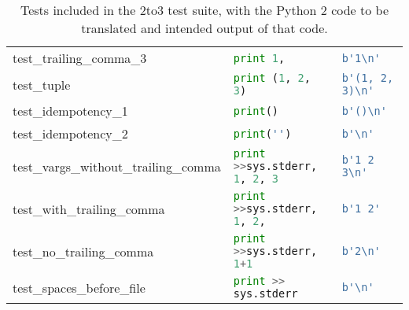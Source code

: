 \begin{table*}[ht]
\begin{tabular}{@{}l|ll@{}}
    test\_trailing\_comma\_3              & \lstinline[language=Python, style=pythonstyle]|print 1,                                             | & \lstinline[language=Python, style=pythonstyle]|b'1\n'                 | \\
    test\_tuple                           & \lstinline[language=Python, style=pythonstyle]|print (1, 2, 3)                                      | & \lstinline[language=Python, style=pythonstyle]|b'(1, 2, 3)\n'         | \\
    test\_idempotency\_1                  & \lstinline[language=Python, style=pythonstyle]|print()                                              | & \lstinline[language=Python, style=pythonstyle]|b'()\n'                | \\
    test\_idempotency\_2                  & \lstinline[language=Python, style=pythonstyle]|print('')                                            | & \lstinline[language=Python, style=pythonstyle]|b'\n'                  | \\
    test\_vargs\_without\_trailing\_comma & \lstinline[language=Python, style=pythonstyle]|print >>sys.stderr, 1, 2, 3| & \lstinline[language=Python, style=pythonstyle]|b'1 2 3\n'             | \\
    test\_with\_trailing\_comma           & \lstinline[language=Python, style=pythonstyle]|print >>sys.stderr, 1, 2,  | & \lstinline[language=Python, style=pythonstyle]|b'1 2'                                | \\
    test\_no\_trailing\_comma             & \lstinline[language=Python, style=pythonstyle]|print >>sys.stderr, 1+1    | & \lstinline[language=Python, style=pythonstyle]|b'2\n'                 | \\
    test\_spaces\_before\_file            & \lstinline[language=Python, style=pythonstyle]|print >> sys.stderr          | & \lstinline[language=Python, style=pythonstyle]|b'\n'                  | \\ \bottomrule
    \end{tabular}
    \caption{Tests included in the 2to3 test suite, with the Python 2 code to be translated and intended output of that code.}
    \label{tab:tests}
\end{table*}